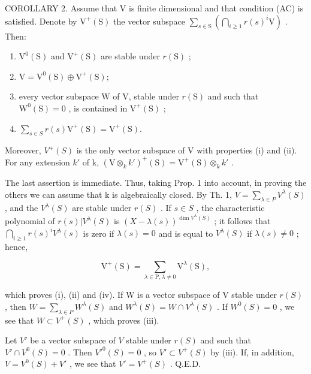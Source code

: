 COROLLARY 2. Assume that V is finite dimensional and that condition (AC) is satisfied. Denote by \(\mathrm{V}^{+}(\mathrm{S})\) the vector subspace \(\sum_{s\in \mathrm{S}}\left(\bigcap_{i\geq 1}r(s)^{i}\mathrm{V}\right)\) . Then:

\begin{enumerate}
\def\labelenumi{(\roman{enumi})}
\item
  \(\mathrm{V}^0 (\mathrm{S})\) and \(\mathrm{V^{+}(S)}\) are stable under \(r(\mathrm{S})\) ;
\item
  \(\mathrm{V} = \mathrm{V}^{0}(\mathrm{S}) \oplus \mathrm{V}^{+}(\mathrm{S});\)
\item
  every vector subspace W of V, stable under \(r(\mathrm{S})\) and such that \(\mathrm{W}^0 (\mathrm{S}) = 0\) , is contained in \(\mathrm{V}^{+}(\mathrm{S})\) ;
\item
  \(\sum_{s\in S}r(s)\mathrm{V}^{+}(\mathrm{S}) = \mathrm{V}^{+}(\mathrm{S}).\)
\end{enumerate}

Moreover, \(V^{+}(S)\) is the only vector subspace of V with properties (i) and (ii). For any extension \(k'\) of k, \((\mathrm{V} \otimes_{k} k')^{+}(\mathrm{S}) = \mathrm{V}^{+}(\mathrm{S}) \otimes_{k} k'\) .

The last assertion is immediate. Thus, taking Prop. 1 into account, in proving the others we can assume that k is algebraically closed. By Th. 1, \(V = \sum_{\lambda \in P} V^{\lambda}(S)\) , and the \(V^{\lambda}(S)\) are stable under \(r(S)\) . If \(s \in S\) , the characteristic polynomial of \(r(s)|V^{\lambda}(S)\) is \((X - \lambda(s))^{\dim V^{\lambda}(S)}\) ; it follows that \(\bigcap_{i \geq 1} r(s)^{i} V^{\lambda}(s)\) is zero if \(\lambda(s) = 0\) and is equal to \(V^{\lambda}(S)\) if \(\lambda(s) \neq 0\) ; hence,

\[
\mathrm{V} ^ {+} (\mathrm{S}) = \sum_ {\lambda \in \mathrm{P}, \lambda \neq 0} \mathrm{V} ^ {\lambda} (\mathrm{S}),\tag{3}
\]

which proves (i), (ii) and (iv). If W is a vector subspace of V stable under \(r(S)\) , then \(W = \sum_{\lambda \in P} W^{\lambda}(S)\) and \(W^{\lambda}(S) = W \cap V^{\lambda}(S)\) . If \(W^{0}(S) = 0\) , we see that \(W \subset V^{+}(S)\) , which proves (iii).

Let \(V'\) be a vector subspace of \(V\) stable under \(r(S)\) and such that \(V' \cap V^0(S) = 0\) . Then \(V'^0(S) = 0\) , so \(V' \subset V^+(S)\) by (iii). If, in addition, \(V = V^0(S) + V'\) , we see that \(V' = V^+(S)\) . Q.E.D.

